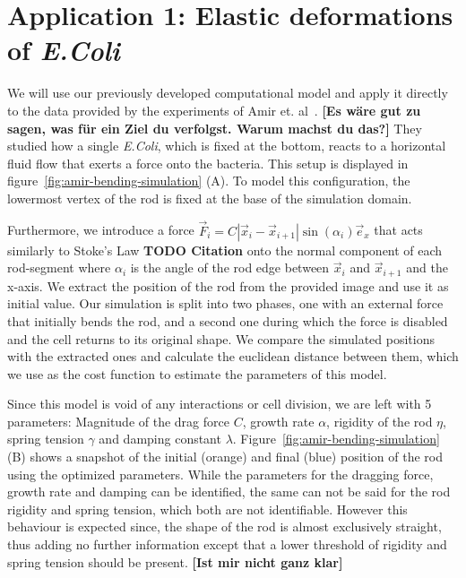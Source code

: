 \documentclass[10pt,letterpaper]{article}
\begin{document}
\section{Application 1: Elastic deformations of \textit{E.Coli}}
\label{section:application-1}

We will use our previously developed computational model and apply it directly to the data provided
by the experiments of Amir et. al~\cite{Amir2014,Amir2014_2}.
\textbf{[Es wäre gut zu sagen, was für ein Ziel du verfolgst. Warum machst du das?]}
They studied how a single \textit{E.Coli}, which is fixed at the bottom, reacts to a horizontal
fluid flow that exerts a force onto the bacteria.
This setup is displayed in figure~\ref{fig:amir-bending-simulation} (A).
To model this configuration, the lowermost vertex of the rod is fixed at the base of the simulation
domain.

Furthermore, we introduce a force $\vec{F}_i = C |\vec{x}_i - \vec{x}_{i+1}|\sin(\alpha_i)\vec{e}_x$
that acts similarly to Stoke's Law \textbf{TODO Citation} onto the normal component of each
rod-segment where $\alpha_i$ is the angle of the rod edge between $\vec{x}_i$ and $\vec{x}_{i+1}$
and the x-axis.
We extract the position of the rod from the provided image and use it as initial value.
Our simulation is split into two phases, one with an external force that initially bends the rod,
and a second one during which the force is disabled and the cell returns to its original shape.
We compare the simulated positions with the extracted ones and calculate the euclidean distance
between them, which we use as the cost function to estimate the parameters of this model.

Since this model is void of any interactions or cell division, we are left with 5 parameters:
Magnitude of the drag force $C$, growth rate $\alpha$, rigidity of the rod $\eta$, spring tension
$\gamma$ and damping constant $\lambda$.
Figure~\ref{fig:amir-bending-simulation} (B) shows a snapshot of the initial (orange) and final
(blue) position of the rod using the optimized parameters.
While the parameters for the dragging force, growth rate and damping can be identified, the same
can not be said for the rod rigidity and spring tension, which both are not identifiable.
However this behaviour is expected since, the shape of the rod is almost exclusively straight, thus
adding no further information except that a lower threshold of rigidity and spring tension should be
present.
\textbf{[Ist mir nicht ganz klar]}
\end{document}
